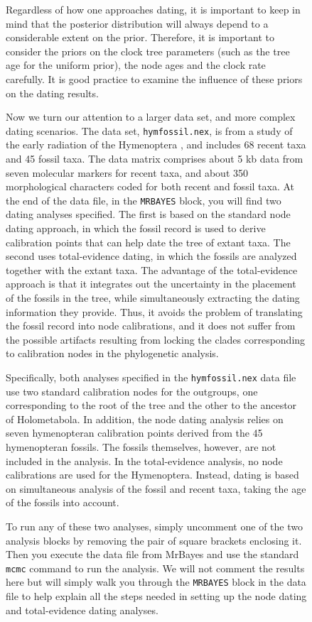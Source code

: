 \documentclass[12pt]{book}
\newcommand{\ttt}[1]{\texttt{#1}}
\begin{document}
\begin{figure}[h]
Regardless of how one approaches dating, it is important to keep in mind that the posterior
distribution will always depend to a considerable extent on the prior. Therefore, it is important
to consider the priors on the clock tree parameters (such as the tree age for the uniform prior),
the node ages and the clock rate carefully. It is good practice to examine the influence of these
priors on the dating results.

Now we turn our attention to a larger data set, and more complex dating scenarios. The data set,
\ttt{hymfossil.nex}, is from a study of the early radiation of the Hymenoptera \citep{ronquist12b},
and includes 68 recent taxa and 45 fossil taxa. The data matrix comprises about 5 kb data from
seven molecular markers for recent taxa, and about 350 morphological characters coded for both
recent and fossil taxa.
At the end of the data file, in the \ttt{MRBAYES} block, you will find two dating analyses
specified. The first is based on the standard node dating approach, in which the fossil record is
used to derive calibration points that can help date the tree of extant taxa. The second uses
total-evidence dating, in which the fossils are analyzed together with the extant taxa. The
advantage of the total-evidence approach is that it integrates out the uncertainty in the placement
of the fossils in the tree, while simultaneously extracting the dating information they provide.
Thus, it avoids the problem of translating the fossil record into node calibrations, and it does
not suffer from the possible artifacts resulting from locking the clades corresponding to
calibration nodes in the phylogenetic analysis.

Specifically, both analyses specified in the \ttt{hymfossil.nex} data file use two standard
calibration nodes for the outgroups, one corresponding to the root of the tree and the other to the
ancestor of Holometabola. In addition, the node dating analysis relies on seven hymenopteran
calibration points derived from the 45 hymenopteran fossils. The fossils themselves, however, are
not included in the analysis. In the total-evidence analysis, no node calibrations are used for the
Hymenoptera. Instead, dating is based on simultaneous analysis of the fossil and recent taxa,
taking the age of the fossils into account.

To run any of these two analyses, simply uncomment one of the two analysis blocks by removing the
pair of square brackets enclosing it. Then you execute the data file from MrBayes and use the
standard \ttt{mcmc} command to run the analysis. We will not comment the results here but will
simply walk you through the \ttt{MRBAYES} block in the data file to help explain all the steps
needed in setting up the node dating and total-evidence dating analyses.


\end{figure}
\end{document}
